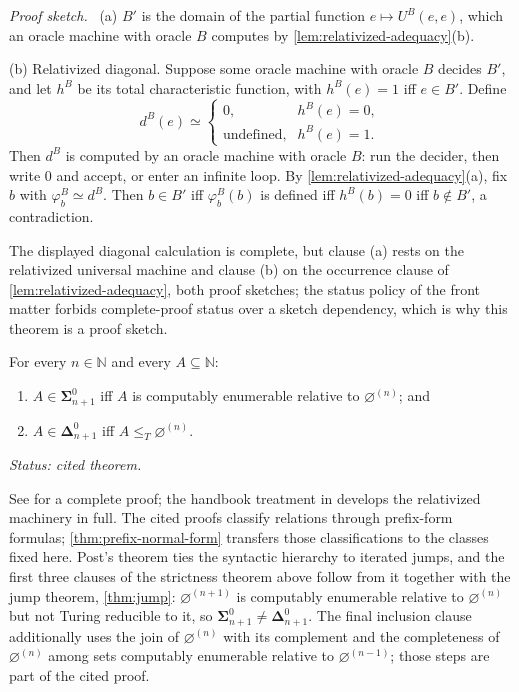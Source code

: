 \documentclass[11pt,oneside,openany]{book}
\theoremstyle{definition}
\theoremstyle{plain}
\newtheorem{theorem}[definition]{Theorem}
\theoremstyle{remark}
\let\LogicTheorem\theorem
\let\endLogicTheorem\endtheorem
\renewenvironment{theorem}[1][]{%
  \LogicTheorem[#1]%
  \if\relax\detokenize{#1}\relax\else\index{#1}\fi
}{\endLogicTheorem}
\newenvironment{proofplan}{\par\noindent\textit{Proof sketch.}\ }{\par}
\newcommand{\N}{\mathbb{N}}
\begin{document}
\begin{proofplan}
(a) \(B'\) is the domain of the partial function
\(e\mapsto U^B(e,e)\), which an oracle machine with oracle \(B\) computes
by \cref{lem:relativized-adequacy}(b).

(b) Relativized diagonal.  Suppose some oracle machine with oracle \(B\)
decides \(B'\), and let \(h^B\) be its total characteristic function,
with \(h^B(e)=1\) iff \(e\in B'\).  Define
\[
  d^B(e)\simeq
  \begin{cases}
    0, & h^B(e)=0,\\
    \text{undefined}, & h^B(e)=1.
  \end{cases}
\]
Then \(d^B\) is computed by an oracle machine with oracle \(B\): run the
decider, then write \(0\) and accept, or enter an infinite loop.  By
\cref{lem:relativized-adequacy}(a), fix \(b\) with
\(\varphi^B_b\simeq d^B\).  Then \(b\in B'\) iff \(\varphi^B_b(b)\) is
defined iff \(h^B(b)=0\) iff \(b\notin B'\), a contradiction.

The displayed diagonal calculation is complete, but clause (a) rests on
the relativized universal machine and clause (b) on the occurrence clause
of \cref{lem:relativized-adequacy}, both proof sketches; the status
policy of the front matter forbids complete-proof status over a sketch
dependency, which is why this theorem is a proof sketch.
\end{proofplan}

\begin{theorem}[Post]
For every \(n\in\N\) and every \(A\subseteq\N\):
\begin{enumerate}
  \item \(A\in\boldsymbol{\Sigma}^0_{n+1}\) iff \(A\) is computably
        enumerable relative to \(\varnothing^{(n)}\); and
  \item \(A\in\boldsymbol{\Delta}^0_{n+1}\) iff
        \(A\leq_T\varnothing^{(n)}\).
\end{enumerate}
\textit{Status: cited theorem.}
\end{theorem}

See \cite{Shoenfield1967} for a complete proof; the handbook treatment in
\cite{Barwise1977} develops the relativized machinery in full.  The cited
proofs classify relations through prefix-form formulas;
\cref{thm:prefix-normal-form} transfers those classifications to the
classes fixed here.  Post's
theorem ties the syntactic hierarchy to iterated jumps, and the first
three clauses of the strictness theorem above follow from it together with
the jump theorem, \cref{thm:jump}:
\(\varnothing^{(n+1)}\) is computably enumerable relative to
\(\varnothing^{(n)}\) but not Turing reducible to it, so
\(\boldsymbol{\Sigma}^0_{n+1}\ne\boldsymbol{\Delta}^0_{n+1}\).  The
final inclusion clause additionally uses the join of
\(\varnothing^{(n)}\) with its complement and the completeness of
\(\varnothing^{(n)}\) among sets computably enumerable relative to
\(\varnothing^{(n-1)}\); those steps are part of the cited proof.
\end{document}
